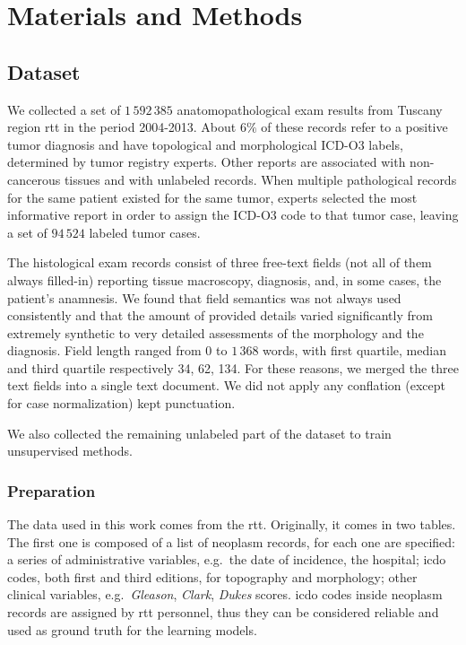 \chapter{Materials and Methods}

\section{Dataset}
\label{sec:dataset}
We collected a set of $1\,592\,385$ anatomopathological exam results
from Tuscany region \ac{rtt} in the period 2004-2013. About $6\%$
of these records refer to a positive tumor
diagnosis and have topological and morphological ICD-O3 labels,
determined by tumor registry experts. Other reports are associated
with non-cancerous tissues and with unlabeled records. When multiple
pathological records for the
same patient existed for the same tumor, experts selected the most
informative report in order to assign the ICD-O3 code to that tumor
case, leaving a set of $94\,524$ labeled tumor cases.

The histological exam records consist of three free-text fields (not all
of them always filled-in) reporting tissue macroscopy, diagnosis,
and, in some cases, the patient's anamnesis. We found that field
semantics was not always used consistently and that the amount of
provided details varied significantly from extremely synthetic to very
detailed assessments of the morphology and the diagnosis. Field length
ranged from $0$ to $1\,368$ words, with first quartile, median and
third quartile respectively 34, 62, 134. For these reasons, we merged
the three text fields
into a single text document. We did not apply any conflation (except for
case normalization) kept punctuation.


We also collected the remaining unlabeled part of the dataset to train
unsupervised methods.

\subsection{Preparation}
The data used in this work comes from the \ac{rtt}. Originally, it
comes in two tables. The first one is composed of
a list of
neoplasm records, for each one are specified: a series of
administrative variables, e.g.\ the date of incidence, the hospital;
\ac{icdo} codes, both first and third editions, for topography and
morphology; other clinical variables, e.g.\ \emph{Gleason},
\emph{Clark}, \emph{Dukes} scores.
\ac{icdo} codes inside neoplasm records are assigned by
\ac{rtt} personnel, thus they can be considered reliable and used as
ground truth for the learning models.

